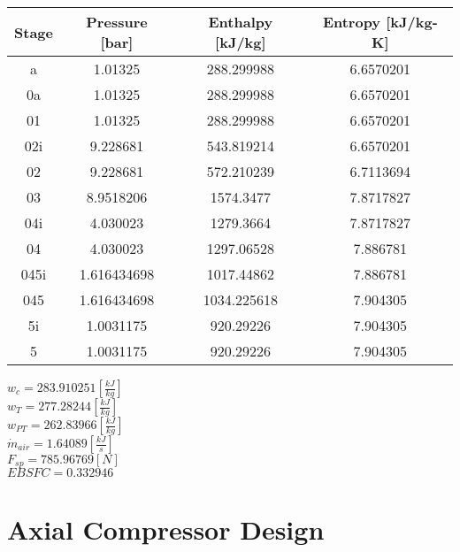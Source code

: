 \documentclass[titlepage]{article}
\begin{document}
    \begin{center}
        \begin{tabular}{|c|c|c|c|}
            \hline
            Stage & Pressure [bar] & Enthalpy [kJ/kg] & Entropy [kJ/kg-K]\\
            \hline
             a & 1.01325 & 288.299988 & 6.6570201 \\
            \hline
            0a & 1.01325 & 288.299988 & 6.6570201 \\
            \hline
            01 & 1.01325 & 288.299988 & 6.6570201 \\
            \hline
            02i & 9.228681 & 543.819214 & 6.6570201 \\
            \hline
            02 & 9.228681 & 572.210239 & 6.7113694 \\
            \hline
            03 & 8.9518206 & 1574.3477 & 7.8717827 \\
            \hline
            04i & 4.030023 & 1279.3664 & 7.8717827 \\
            \hline
            04 & 4.030023 & 1297.06528 & 7.886781 \\
            \hline
            045i & 1.616434698 & 1017.44862 & 7.886781 \\
            \hline
            045 & 1.616434698 & 1034.225618 & 7.904305 \\
            \hline
            5i & 1.0031175 & 920.29226 & 7.904305 \\
            \hline
            5 & 1.0031175 & 920.29226 & 7.904305 \\
            \hline
        \end{tabular}
    \end{center}

    \begin{center}
        $w_{c} = 283.910251 [\frac{kJ}{kg}]$ \\
        $w_{T} = 277.28244 [\frac{kJ}{kg}]$ \\
        $w_{PT} = 262.83966 [\frac{kJ}{kg}]$ \\
        $\dot{m}_{air} = 1.64089 [\frac{kJ}{s}]$ \\
        $F_{sp} = 785.96769 [N]$ \\
        $EBSFC = 0.332946$ \\
    \end{center}

    \section{Axial Compressor Design}
  
\end{document}
